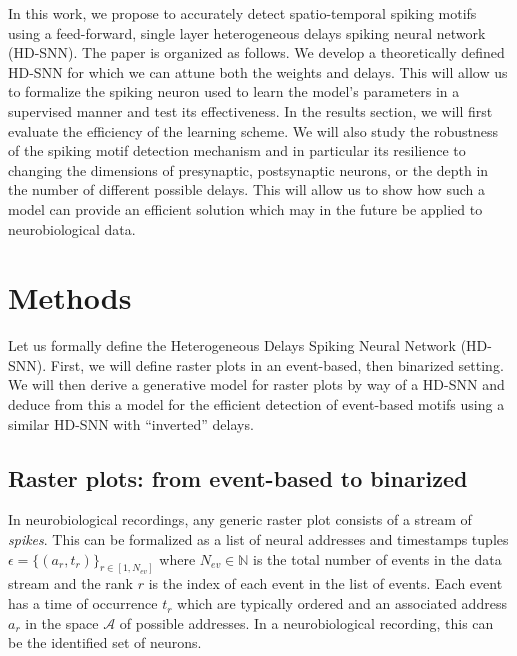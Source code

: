 \documentclass[runningheads]{llncs}
\newcommand{\presynaddr}{a} %
\newcommand{\numevent}{N_{ev}} %
\newcommand{\presynaddrspace}{\mathcal{A}} %
\newcommand{\arank}{r} %
\newcommand{\timev}{t} %
\newcommand{\event}{\epsilon} %
\begin{document}
In this work, we propose to accurately detect spatio-temporal spiking motifs using a feed-forward, single layer heterogeneous delays spiking neural network  (HD-SNN). The paper is organized as follows. We develop a theoretically defined HD-SNN for which we can attune both the weights and delays. %
This will allow us to formalize the spiking neuron used to learn the model's parameters in a supervised manner and test its effectiveness. In the results section, we will first evaluate the efficiency of the learning scheme. We will also study the robustness of the spiking motif detection mechanism and in particular its resilience to changing the dimensions of presynaptic, postsynaptic neurons, or the depth in the number of different possible delays. This will allow us to show how such a model can provide an efficient solution which may in the future be applied to neurobiological data.  %
%
\section{Methods}
\label{sec:methods}
Let us formally define the Heterogeneous Delays Spiking Neural Network (HD-SNN). First, we will define raster plots in an event-based, then binarized setting. We will then derive a generative model for raster plots by way of a HD-SNN and deduce from this a model for the efficient detection of event-based motifs using a similar HD-SNN with ``inverted'' delays.
%
\subsection{Raster plots: from event-based to binarized}
%
In neurobiological recordings, %
any generic raster plot consists of a stream of \emph{spikes}. This can be formalized as a list of neural addresses and timestamps tuples $\event = \{(\presynaddr_\arank, \timev_\arank)\}_{\arank \in [1,\numevent]}$ where $\numevent \in \mathbb{N}$ is the total number of events in the data stream and the rank $\arank$ is the index of each event in the list of events. Each event has a time of occurrence $\timev_\arank$ which are typically ordered and an associated address $\presynaddr_\arank$ in the space $\presynaddrspace$ of possible addresses. In a neurobiological recording, this can be the identified set of neurons.
\end{document}
